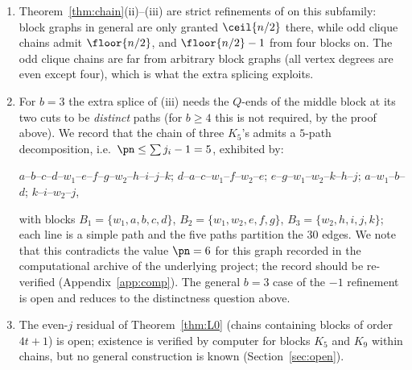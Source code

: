 \begin{remark}\label{rem:chaincomp}
\begin{enumerate}[label={\rm(\arabic*)},leftmargin=2em]
\item Theorem~\ref{thm:chain}(ii)--(iii) are strict refinements of \cite{CW25} on this
subfamily: block graphs in general are only granted $\ceil{n/2}$ there, while odd clique chains
admit $\floor{n/2}$, and $\floor{n/2}-1$ from four blocks on. The odd clique chains are far from
arbitrary block graphs (all vertex degrees are even except four), which is what the extra
splicing exploits.
\item For $b=3$ the extra splice of (iii) needs the $Q$-ends of the middle block at its two
cuts to be \emph{distinct} paths (for $b\ge4$ this is not required, by the proof above). We
record that the chain of three $K_5$'s admits a $5$-path decomposition, i.e.\
$\pn\le\sum j_i-1=5$, exhibited by:
\begin{center}\small
$a$--$b$--$c$--$d$--$w_1$--$e$--$f$--$g$--$w_2$--$h$--$i$--$j$--$k$;\quad
$d$--$a$--$c$--$w_1$--$f$--$w_2$--$e$;\quad
$e$--$g$--$w_1$--$w_2$--$k$--$h$--$j$;\quad
$a$--$w_1$--$b$--$d$;\quad
$k$--$i$--$w_2$--$j$,
\end{center}
with blocks $B_1=\{w_1,a,b,c,d\}$, $B_2=\{w_1,w_2,e,f,g\}$, $B_3=\{w_2,h,i,j,k\}$; each line is
a simple path and the five paths partition the $30$ edges. We note that this contradicts the
value $\pn=6$ for this graph recorded in the computational archive of the underlying project;
the record should be re-verified (Appendix~\ref{app:comp}). The general $b=3$ case of the
$-1$ refinement is open and reduces to the distinctness question above.
\item The even-$j$ residual of Theorem~\ref{thm:L0} (chains containing blocks of order
$4t+1$) is open; existence is verified by computer for blocks $K_5$ and $K_9$ within chains,
but no general construction is known (Section~\ref{sec:open}).
\end{enumerate}
\end{remark}

